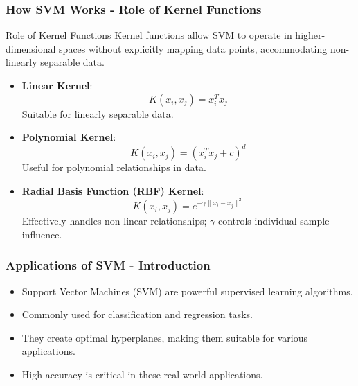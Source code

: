 \documentclass[aspectratio=169]{beamer}
\begin{document}
\begin{frame}[fragile]
    \frametitle{How SVM Works - Role of Kernel Functions}
    \begin{block}{Role of Kernel Functions}
        Kernel functions allow SVM to operate in higher-dimensional spaces without explicitly mapping data points, accommodating non-linearly separable data.
        
        \begin{itemize}
            \item \textbf{Linear Kernel}:
            \begin{equation}
            K(x_i, x_j) = x_i^T x_j
            \end{equation}
            Suitable for linearly separable data.
            
            \item \textbf{Polynomial Kernel}:
            \begin{equation}
            K(x_i, x_j) = (x_i^T x_j + c)^d
            \end{equation}
            Useful for polynomial relationships in data.

            \item \textbf{Radial Basis Function (RBF) Kernel}:
            \begin{equation}
            K(x_i, x_j) = e^{-\gamma \|x_i - x_j\|^2}
            \end{equation}
            Effectively handles non-linear relationships; \(\gamma\) controls individual sample influence.
        \end{itemize}
    \end{block}
\end{frame}

\begin{frame}[fragile]
    \frametitle{Applications of SVM - Introduction}
    \begin{itemize}
        \item Support Vector Machines (SVM) are powerful supervised learning algorithms.
        \item Commonly used for classification and regression tasks.
        \item They create optimal hyperplanes, making them suitable for various applications.
        \item High accuracy is critical in these real-world applications.
    \end{itemize}
\end{frame}
\end{document}
